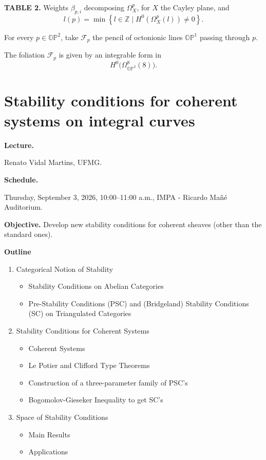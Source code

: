 \medskip\noindent
{\bf TABLE 2.}
Weights $\beta_{p,i}$ decomposing
$\Omega_X^p$, for $X$ the Cayley plane,
and
$$
l(p)=
\min\left\{
l\in\mathbb{Z}
\mid
H^0(\Omega_X^p(l))\neq 0
\right\}.
$$

For every $p\in\mathbb{OP}^2$, take
$\mathcal{F}_p$ the pencil of octonionic
lines $\mathbb{OP}^1$ passing through
$p$.

\begin{theorem}
The foliation $\mathcal{F}_p$ is given by
an integrable form in
$$
H^0\bigl(\Omega_{\mathbb{OP}^2}^8(8)\bigr).
$$
\end{theorem}

\section{Stability conditions for coherent
systems on integral curves}
\label{section-stability-coherent-systems}

\medskip\noindent
{\bf Lecture.}

Renato Vidal Martins,
UFMG.

\medskip\noindent
{\bf Schedule.}

Thursday, September 3, 2026,
10:00--11:00 a.m.,
IMPA - Ricardo Ma\~n\'e Auditorium.

\medskip\noindent
{\bf Objective.} Develop new
stability conditions for coherent sheaves
(other than the standard ones).

\medskip\noindent
{\bf Outline}

\begin{enumerate}
\item Categorical Notion of Stability
\begin{itemize}
\item Stability Conditions on Abelian
Categories
\item Pre-Stability Conditions (PSC) and
(Bridgeland) Stability Conditions (SC) on
Triangulated Categories
\end{itemize}

\item Stability Conditions for Coherent
Systems
\begin{itemize}
\item Coherent Systems
\item Le Potier and Clifford Type Theorems
\item Construction of a three-parameter
family of PSC's
\item Bogomolov-Gieseker Inequality to get
SC's
\end{itemize}

\item Space of Stability Conditions
\begin{itemize}
\item Main Results
\item Applications
\end{itemize}
\end{enumerate}

